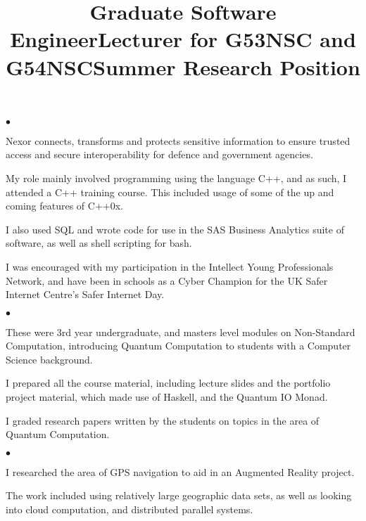\documentclass[line]{res}
\newenvironment{list2}{
  \begin{list}{$\bullet$}{%
      \setlength{\itemsep}{0in}
      \setlength{\parsep}{0.045in} \setlength{\parskip}{0in}
      \setlength{\topsep}{0in} \setlength{\partopsep}{0in}
      \setlength{\leftmargin}{0.2in}}}{\end{list}}
\begin{document}
\begin{resume}
\title{Graduate Software Engineer}
\begin{position}
\vspace{-4mm}
\begin{list2}
\item Nexor connects, transforms and protects sensitive information to
  ensure trusted access and secure interoperability for defence and
  government agencies. 
\item My role mainly involved programming using the language C++,  and
  as such, I attended a C++ training course. This included usage of
  some of the up and coming features of C++0x.
\item I also used SQL and wrote code for use in the SAS
  Business Analytics suite of software, as well as shell scripting for
  bash.
\item I was encouraged with my participation in the Intellect
  Young Professionals Network, and have been in schools as a Cyber
  Champion for the UK Safer Internet Centre's Safer Internet Day.
\end{list2}
\end{position}

\title{Lecturer for G53NSC and G54NSC}
\begin{position}
\vspace{-4mm}
\begin{list2}
\item These were 3rd year undergraduate, and masters level 
  modules on Non-Standard Computation, introducing Quantum
  Computation to students with a Computer Science background.
\item I prepared all the course material, including lecture slides and
  the portfolio project material, which made use of Haskell, and the 
  Quantum IO Monad.
\item I graded research papers written by the students on topics
  in the area of Quantum Computation.
\end{list2}
\end{position}

 
\title{Summer Research Position}
\begin{position}
\vspace{-4mm}
\begin{list2}
\item I researched the area of GPS navigation to aid in an Augmented
  Reality project.
\item The work included using relatively large geographic data sets,
  as well as looking into cloud computation, and distributed parallel
  systems.
\end{list2}
\end{position}


\end{resume}
\end{document}
